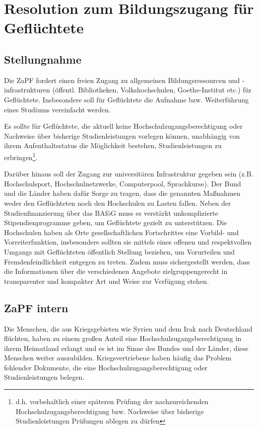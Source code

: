 \section{Resolution zum Bildungszugang für Geflüchtete}
\subsection*{Stellungnahme}
Die ZaPF fordert einen freien Zugang zu allgemeinen Bildungsressourcen und -
infrastrukturen (öffentl. Bibliotheken, Volkshochschulen, Goethe-Institut etc.)
für Geflüchtete. Insbesondere soll für Geflüchtete die Aufnahme bzw.
Weiterführung eines Studiums vereinfacht werden. 

Es sollte für Geflüchtete, die aktuell keine  Hochschulzugangsberechtigung oder
Nachweise über bisherige Studienleistungen vorlegen können, unabhängig von
ihrem Aufenthaltsstatus die Möglichkeit bestehen, Studienleistungen zu
erbringen\footnote{d.h. vorbehaltlich einer späteren Prüfung der
	nachzureichenden Hochschulzugangsberechtigung bzw. Nachweise über bisherige
Studienleistungen Prüfungen ablegen zu dürfen}.

Darüber hinaus soll der Zugang zur universitären Infrastruktur gegeben sein
(z.B. Hochschulsport, Hochschulnetzwerke, Computerpool, Sprachkurse). Der Bund
und die Länder haben dafür Sorge zu tragen, dass die genannten Maßnahmen weder
den Geflüchteten noch den Hochschulen zu Lasten fallen. Neben der
Studienfinanzierung über das BAföG muss es verstärkt unkomplizierte
Stipendienprogramme geben, um Geflüchtete gezielt zu unterstützen. Die
Hochschulen haben als Orte gesellschaftlichen Fortschrittes eine Vorbild- und
Vorreiterfunktion, insbesondere sollten sie mittels eines offenen und
respektvollen Umgangs mit Geflüchteten öffentlich Stellung beziehen, um
Vorurteilen und Fremdenfeindlichkeit entgegen zu treten. Zudem muss
sichergestellt werden, dass die Informationen über die verschiedenen Angebote  %
zielgruppengerecht in transparenter und kompakter Art und Weise zur Verfügung
stehen.

\subsection*{ZaPF intern}
Die Menschen, die aus Kriegsgebieten wie Syrien und dem Irak nach Deutschland
flüchten, haben zu einem großen Anteil eine Hochschulzugangsberechtigung in
ihrem Heimatland erlangt und es ist im Sinne des Bundes und der Länder, diese
Menschen weiter auszubilden. Kriegsvertriebene haben häufig das Problem
fehlender Dokumente, die eine Hochschulzugangsberechtigung oder
Studienleistungen belegen.

